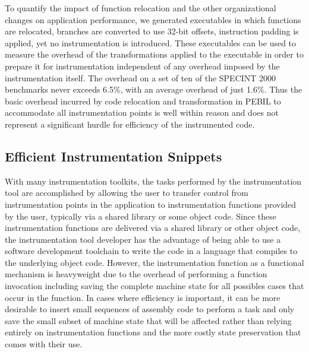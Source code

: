 To quantify the impact of function relocation and the other organizational
changes on application performance, we generated executables in which functions
are relocated, branches are converted to use 32-bit offsets, instruction padding
is applied, yet no instrumentation is introduced. These executables can be used
to measure the overhead of the transformations applied to the executable in
order to prepare it for instrumentation independent of any overhead imposed by
the instrumentation itself. The overhead on a set of ten of the SPECINT 2000
benchmarks never exceeds 6.5\%, with an average overhead of just 1.6\%. Thus the
basic overhead incurred by code relocation and transformation in PEBIL to
accommodate all instrumentation points is well within reason and does not
represent a significant hurdle for efficiency of the instrumented code.

\subsection{Efficient Instrumentation Snippets}

With many instrumentation toolkits, the tasks performed by the instrumentation
tool are accomplished by allowing the user to transfer control from
instrumentation points in the application to instrumentation functions provided
by the user, typically via a shared library or some object code. Since these
instrumentation functions are delivered via a shared library or other object
code, the instrumentation tool developer has the advantage of being able to use
a software development toolchain to write the code in a language that
compiles to the underlying object code. However, the instrumentation function as
a functional mechanism is heavyweight due to the overhead of performing a
function invocation including saving the complete machine state for all
possibles cases that occur in the function. In cases where efficiency is
important, it can be more desirable to insert small sequences of assembly code
to perform a task and only save the small subset of machine state that will be
affected rather than relying entirely on instrumentation functions and the more
costly state preservation that comes with their use.


